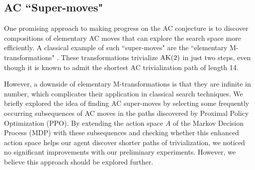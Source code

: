 \subsection{AC ``Super-moves"} One promising approach to making progress on the AC conjecture is to discover compositions of elementary AC moves that can explore the search space more efficiently. A classical example of such ``super-moves" are the ``elementary M-transformations" \cite{BurnsI, BurnsII}. These transformations trivialize $\text{AK}(2)$ in just two steps, even though it is known to admit the shortest AC trivialization path of length 14.
\newline 

However, a downside of elementary M-transformations is that they are infinite in number, which complicates their application in classical search techniques. We briefly explored the idea of finding AC super-moves by selecting some frequently occurring subsequences of AC moves in the paths discovered by Proximal Policy Optimization (PPO). By extending the action space $A$ of the Markov Decision Process (MDP) with these subsequences and checking whether this enhanced action space helps our agent discover shorter paths of trivialization, we noticed no significant improvements with our preliminary experiments. However, we believe this approach should be explored further.